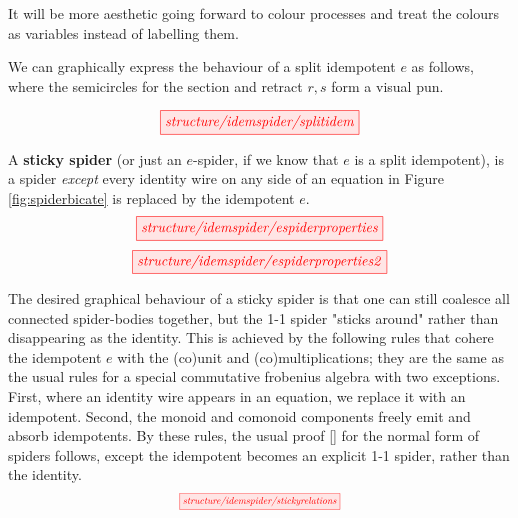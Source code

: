 
It will be more aesthetic going forward to colour processes and treat the colours as variables instead of labelling them.

 We can graphically express the behaviour of a split idempotent $e$ as follows, where the semicircles for the section and retract $r,s$ form a visual pun.

\[\scalebox{1}{\tikzfig{structure/idemspider/splitidem}}\]

\begin{defn}\label{defn:stickyspider}
A \textbf{sticky spider} (or just an $e$-spider, if we know that $e$ is a split idempotent), is a spider \emph{except} every identity wire on any side of an equation in Figure \ref{fig:spiderbicate} is replaced by the idempotent $e$.
\[\scalebox{1}{\tikzfig{structure/idemspider/espiderproperties}}\]
\[\scalebox{1}{\tikzfig{structure/idemspider/espiderproperties2}}\]

The desired graphical behaviour of a sticky spider is that one can still coalesce all connected spider-bodies together, but the 1-1 spider "sticks around" rather than disappearing as the identity. This is achieved by the following rules that cohere the idempotent $e$ with the (co)unit and (co)multiplications; they are the same as the usual rules for a special commutative frobenius algebra with two exceptions. First, where an identity wire appears in an equation, we replace it with an idempotent. Second, the monoid and comonoid components freely emit and absorb idempotents. By these rules, the usual proof [] for the normal form of spiders follows, except the idempotent becomes an explicit 1-1 spider, rather than the identity.
\[\scalebox{0.7}{\tikzfig{structure/idemspider/stickyrelations}}\]
\end{defn}

